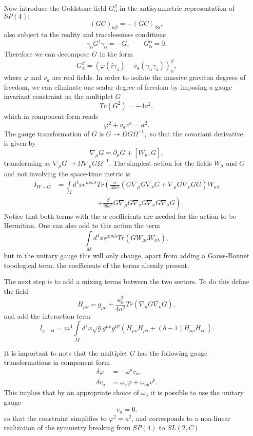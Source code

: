 \documentclass[a4paper,12pt]{article}
\begin{document}
Now introduce the Goldstone field $G_{\alpha}^{\beta}$ in the antisymmetric
representation of $SP(4):$
\[
\left(  GC\right)  _{\alpha\beta}=-\left(  GC\right)  _{\beta\alpha},
\]
also subject to the reality and tracelessness conditions
\[
\gamma_{0}G^{\dagger}\gamma_{0}=-G,\qquad G_{\alpha}^{\alpha}=0.
\]
Therefore we can decompose $G$ in the form%
\[
G_{\alpha}^{\beta}=\left(  \varphi\left(  i\gamma_{5}\right)  -v_{a}\left(
\gamma_{a}\gamma_{5}\right)  \right)  _{\alpha}^{\beta},
\]
where $\varphi$ and $v_{a}$ are real fields. In order to isolate the massive
graviton degrees of freedom, we can eliminate one scalar degree of freedom by
imposing a gauge invariant constraint on the multiplet $G$ \cite{ch78}
\[
Tr\left(  G^{2}\right)  =-4a^{2},
\]
which in component form reads
\[
\varphi^{2}+v_{a}v^{a}=a^{2}.
\]
The gauge transformation of $G$ is $G\rightarrow\Omega G\Omega^{-1},$ so that
the covariant derivative is given by%
\[
\nabla_{\mu}G=\partial_{\mu}G+\left[  W_{\mu},G\right]  ,
\]
transforming as $\nabla_{\mu}G\rightarrow\Omega\nabla_{\mu}G\Omega^{-1}.$ The
simplest action for the fields $W_{\mu}$ and $G$ and not involving the
space-time metric is
\begin{align*}
I_{W-G} &  =\int\limits_{M}d^{4}x\epsilon^{\mu\nu\kappa\lambda}Tr\left(
\frac{\alpha}{32a^{3}}\left(  G\nabla_{\mu}G\nabla_{\nu}G+\nabla_{\mu}%
G\nabla_{\nu}GG\right)  W_{\kappa\lambda}\right.  \\
&  \hspace{1in}\left.  +\frac{\beta}{96a^{5}}G\nabla_{\mu}G\nabla_{\nu}%
G\nabla_{\kappa}G\nabla_{\lambda}G\right)  .
\end{align*}
Notice that both terms with the $\alpha$ coefficients are needed for the
action to be Hermitian. One can also add to this action the term%
\[
\int\limits_{M}d^{4}x\epsilon^{\mu\nu\kappa\lambda}Tr\left(  GW_{\mu\nu
}W_{\kappa\lambda}\right)  ,
\]
but in the unitary gauge this will only change, apart from adding a
Gauss-Bonnet topological term, the coefficients of the terms already present.

The next step is to add a mixing terms between the two sectors. To do this
define the field \cite{ags}%
\[
H_{\mu\nu}=g_{\mu\nu}+\frac{\kappa_{0}^{2}}{4a^{2}}Tr\left(  \nabla_{\mu
}G\nabla_{\nu}G\right)  ,
\]
and add the interaction term%
\[
I_{g-H}=m^{4}\int\limits_{M}d^{4}x\sqrt{g}g^{\mu\rho}g^{\nu\sigma}\left(
H_{\mu\nu}H_{\rho\sigma}+(b-1)H_{\mu\rho}H_{\nu\sigma}\right)  .
\]

It is important to note that the multiplet $G$ has the following gauge
transformations in component form%
\begin{align*}
\delta\varphi &  =-\omega^{a}v_{a},\\
\delta v_{a}  &  =\omega_{a}\varphi+\omega_{ab}v^{b}.
\end{align*}
This implies that by an appropriate choice of $\omega_{a}$ it is possible to
use the unitary gauge
\[
v_{a}=0.
\]
so that the constraint simplifies to $\varphi^{2}=a^{2}$, and corresponds to a
non-linear realization of the symmetry breaking from $SP(4)$ to $SL(2,C)$ \cite{zu}
\end{document}
